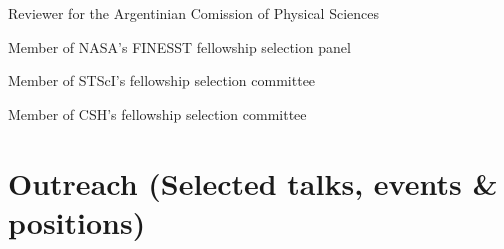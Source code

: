 \documentclass[12pt, a4paper]{article} %
\begin{document}
\vspace{0.2cm}

\begin{minipage}[t]{0.7\textwidth}
\begin{flushleft}%
  \setlength{\leftskip}{0.2cm}%
Reviewer for the Argentinian Comission of Physical Sciences
\end{flushleft}
\end{minipage}
\begin{minipage}[t]{0.3\textwidth}
\end{minipage}

\vspace{0.2cm}

\begin{minipage}[t]{0.7\textwidth}
\begin{flushleft}%
  \setlength{\leftskip}{0.2cm}%
Member of NASA's FINESST fellowship selection panel
\end{flushleft}
\end{minipage}
\begin{minipage}[t]{0.3\textwidth}
\hfill 
\end{minipage}

\vspace{0.2cm}

\begin{minipage}[t]{0.7\textwidth}
\begin{flushleft}%
  \setlength{\leftskip}{0.2cm}%
Member of STScI's fellowship selection committee
\end{flushleft}
\end{minipage}
\begin{minipage}[t]{0.3\textwidth}
\hfill 
\end{minipage}

\vspace{0.2cm}

\begin{minipage}[t]{0.7\textwidth}
\begin{flushleft}%
  \setlength{\leftskip}{0.2cm}%
Member of CSH's fellowship selection committee
\end{flushleft}
\end{minipage}
\begin{minipage}[t]{0.3\textwidth}
\hfill 
\end{minipage}

\section*{Outreach (Selected talks, events \& positions)}
\end{document}
